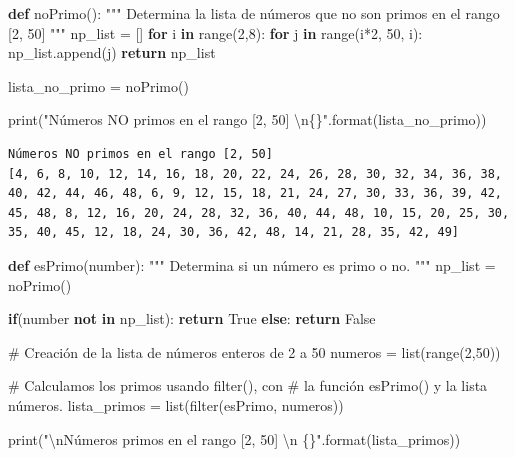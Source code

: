 \documentclass[
  spanish,
  letterpaper,
]{scrbook}
\newenvironment{Shaded}{\begin{snugshade}}{\end{snugshade}}
\newcommand{\BuiltInTok}[1]{\textcolor[rgb]{0.00,0.23,0.31}{#1}}
\newcommand{\CharTok}[1]{\textcolor[rgb]{0.13,0.47,0.30}{#1}}
\newcommand{\CommentTok}[1]{\textcolor[rgb]{0.37,0.37,0.37}{#1}}
\newcommand{\ControlFlowTok}[1]{\textcolor[rgb]{0.00,0.23,0.31}{\textbf{#1}}}
\newcommand{\DecValTok}[1]{\textcolor[rgb]{0.68,0.00,0.00}{#1}}
\newcommand{\KeywordTok}[1]{\textcolor[rgb]{0.00,0.23,0.31}{\textbf{#1}}}
\newcommand{\NormalTok}[1]{\textcolor[rgb]{0.00,0.23,0.31}{#1}}
\newcommand{\OperatorTok}[1]{\textcolor[rgb]{0.37,0.37,0.37}{#1}}
\newcommand{\SpecialCharTok}[1]{\textcolor[rgb]{0.37,0.37,0.37}{#1}}
\newcommand{\StringTok}[1]{\textcolor[rgb]{0.13,0.47,0.30}{#1}}
\newcommand{\VariableTok}[1]{\textcolor[rgb]{0.07,0.07,0.07}{#1}}
\theoremstyle{definition}
\theoremstyle{remark}
\begin{document}
\begin{Shaded}
\begin{Highlighting}[]
\KeywordTok{def}\NormalTok{ noPrimo():}
    \CommentTok{"""}
\CommentTok{    Determina la lista de números que no son primos en el }
\CommentTok{    rango [2, 50]}
\CommentTok{    """}
\NormalTok{    np\_list }\OperatorTok{=}\NormalTok{ []}
    \ControlFlowTok{for}\NormalTok{ i }\KeywordTok{in} \BuiltInTok{range}\NormalTok{(}\DecValTok{2}\NormalTok{,}\DecValTok{8}\NormalTok{):}
        \ControlFlowTok{for}\NormalTok{ j }\KeywordTok{in} \BuiltInTok{range}\NormalTok{(i}\OperatorTok{*}\DecValTok{2}\NormalTok{, }\DecValTok{50}\NormalTok{, i):}
\NormalTok{            np\_list.append(j)}
    \ControlFlowTok{return}\NormalTok{ np\_list}

\NormalTok{lista\_no\_primo }\OperatorTok{=}\NormalTok{ noPrimo()}

\BuiltInTok{print}\NormalTok{(}\StringTok{"Números NO primos en el rango [2, 50] }\CharTok{\textbackslash{}n}\SpecialCharTok{\{\}}\StringTok{"}\NormalTok{.}\BuiltInTok{format}\NormalTok{(lista\_no\_primo))}
\end{Highlighting}
\end{Shaded}

\begin{verbatim}
Números NO primos en el rango [2, 50] 
[4, 6, 8, 10, 12, 14, 16, 18, 20, 22, 24, 26, 28, 30, 32, 34, 36, 38, 40, 42, 44, 46, 48, 6, 9, 12, 15, 18, 21, 24, 27, 30, 33, 36, 39, 42, 45, 48, 8, 12, 16, 20, 24, 28, 32, 36, 40, 44, 48, 10, 15, 20, 25, 30, 35, 40, 45, 12, 18, 24, 30, 36, 42, 48, 14, 21, 28, 35, 42, 49]
\end{verbatim}

\begin{Shaded}
\begin{Highlighting}[]
\KeywordTok{def}\NormalTok{ esPrimo(number):}
    \CommentTok{"""}
\CommentTok{    Determina si un número es primo o no.}
\CommentTok{    """}
\NormalTok{    np\_list }\OperatorTok{=}\NormalTok{ noPrimo()}
    
    \ControlFlowTok{if}\NormalTok{(number }\KeywordTok{not} \KeywordTok{in}\NormalTok{ np\_list):}
        \ControlFlowTok{return} \VariableTok{True}
    \ControlFlowTok{else}\NormalTok{:}
        \ControlFlowTok{return} \VariableTok{False}

\CommentTok{\# Creación de la lista de números enteros de 2 a 50}
\NormalTok{numeros }\OperatorTok{=} \BuiltInTok{list}\NormalTok{(}\BuiltInTok{range}\NormalTok{(}\DecValTok{2}\NormalTok{,}\DecValTok{50}\NormalTok{))}

\CommentTok{\# Calculamos los primos usando filter(), con }
\CommentTok{\# la función esPrimo() y la lista números.}
\NormalTok{lista\_primos }\OperatorTok{=} \BuiltInTok{list}\NormalTok{(}\BuiltInTok{filter}\NormalTok{(esPrimo, numeros))}

\BuiltInTok{print}\NormalTok{(}\StringTok{"}\CharTok{\textbackslash{}n}\StringTok{Números primos en el rango [2, 50] }\CharTok{\textbackslash{}n}\StringTok{ }\SpecialCharTok{\{\}}\StringTok{"}\NormalTok{.}\BuiltInTok{format}\NormalTok{(lista\_primos))}
\end{Highlighting}
\end{Shaded}
\end{document}
